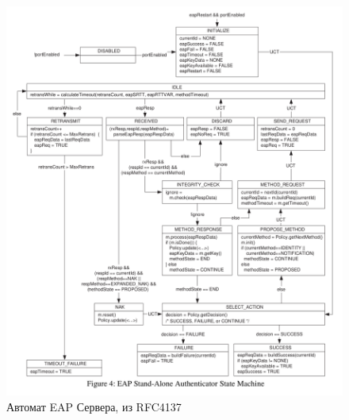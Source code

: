 \documentclass{extarticle}
\begin{document}
\begin{figure}
  \centering \includegraphics{res/eap-server-state-machine-rfc4137.png}
  \caption{Автомат EAP Сервера, из RFC4137}
\end{figure}
\end{document}
